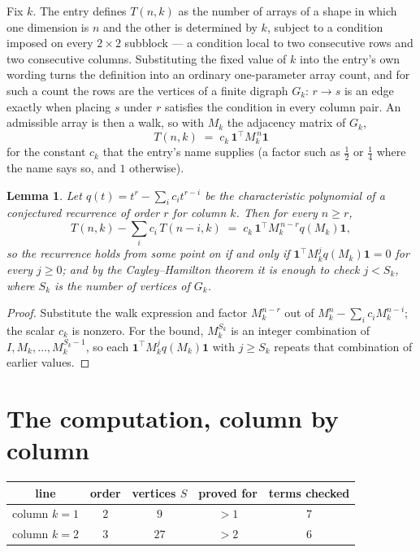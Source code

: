 \documentclass[11pt,a4paper]{article}
\theoremstyle{plain}
\newtheorem{lemma}[theorem]{Lemma}
\theoremstyle{definition}
\begin{document}
Fix $k$. The entry defines $T(n,k)$ as the number of arrays of a shape in which one dimension
is $n$ and the other is determined by $k$, subject to a condition imposed on every
$2\times2$ subblock --- a condition local to two consecutive rows and two consecutive columns.
Substituting the fixed value of $k$ into the entry's own wording turns the definition into an
ordinary one-parameter array count, and for such a count the rows are the vertices of a finite
digraph $G_k$: $r\to s$ is an edge exactly when placing $s$ under $r$ satisfies the condition
in every column pair. An admissible array is then a walk, so with $M_k$ the adjacency matrix
of $G_k$,
\[
T(n,k)\;=\;c_k\,\mathbf{1}^{\!\top}M_k^{\,n}\mathbf{1}
\]
for the constant $c_k$ that the entry's name supplies (a factor such as $\tfrac12$ or
$\tfrac14$ where the name says so, and $1$ otherwise).

\begin{lemma}\label{lem:crit}
Let $q(t)=t^{r}-\sum_i c_it^{r-i}$ be the characteristic polynomial of a conjectured
recurrence of order $r$ for column $k$. Then for every $n\ge r$,
\[
T(n,k)-\sum_i c_i\,T(n-i,k)\;=\;c_k\,\mathbf{1}^{\!\top}M_k^{\,n-r}q(M_k)\mathbf{1},
\]
so the recurrence holds from some point on if and only if
$\mathbf{1}^{\!\top}M_k^{j}q(M_k)\mathbf{1}=0$ for every $j\ge0$; and by the
Cayley--Hamilton theorem it is enough to check $j<S_k$, where $S_k$ is the number of vertices
of $G_k$.
\end{lemma}

\begin{proof}
Substitute the walk expression and factor $M_k^{n-r}$ out of $M_k^{n}-\sum_ic_iM_k^{n-i}$;
the scalar $c_k$ is nonzero. For the bound, $M_k^{S_k}$ is an integer combination of
$I,M_k,\dots,M_k^{S_k-1}$, so each $\mathbf{1}^{\!\top}M_k^{j}q(M_k)\mathbf{1}$ with
$j\ge S_k$ repeats that combination of earlier values.
\end{proof}

\section{The computation, column by column}

\begin{center}
\begin{tabular}{ccccc}
line & order & vertices $S$ & proved for & terms checked \\ \hline
column $k$$=1$ & $2$ & $9$ & $>1$ & $7$ \\
column $k$$=2$ & $3$ & $27$ & $>2$ & $6$ \\
\end{tabular}
\end{center}
\end{document}
